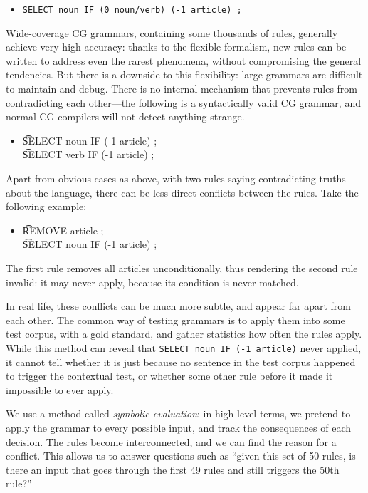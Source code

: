 \begin{itemize}
\item[] \texttt{SELECT noun IF (0 noun/verb) (-1 article) ;}
\end{itemize}

Wide-coverage CG grammars, containing some thousands of rules, 
generally achieve very high accuracy: 
thanks to the flexible formalism, new rules can be written 
to address even the rarest phenomena, without compromising the general tendencies.
But there is a downside to this flexibility: large grammars are difficult to maintain
and debug. There is no internal mechanism that prevents rules from contradicting 
each other---the following is a syntactically valid CG grammar, and normal CG compilers will not detect anything strange.

\begin{itemize}
\item[] \t{SELECT noun IF (-1 article) ;} \\ \t{SELECT verb IF (-1 article) ;}
\end{itemize}

Apart from obvious cases as above, with two rules saying contradicting truths about the language, there can be less direct conflicts between the rules. Take the following example:

\begin{itemize}
\item[] \t{REMOVE article ;} \\ \t{SELECT noun IF (-1 article) ;}
\end{itemize}

\noindent The first rule removes all articles unconditionally, thus rendering the second rule invalid: it may never apply, because its condition is never matched.

In real life, these conflicts can be much more subtle, and appear far apart from each other. %
The common way of testing grammars is to apply them into some test corpus, with a gold standard, and gather statistics how often the rules apply. While this method can reveal that \texttt{SELECT noun IF (-1 article)} never applied, it cannot tell whether it is just because no sentence in the test corpus happened to trigger the contextual test, or whether some other rule before it made it impossible to ever apply. 

We use a method called \emph{symbolic evaluation}: in high level terms, we pretend to apply the grammar to every possible input, and track the consequences of each decision. 
The rules become interconnected, and we can find the reason for a conflict. This allows us to answer questions such as ``given this set of 50 rules, is there an input that goes through the first 49 rules and still triggers the 50th rule?''

